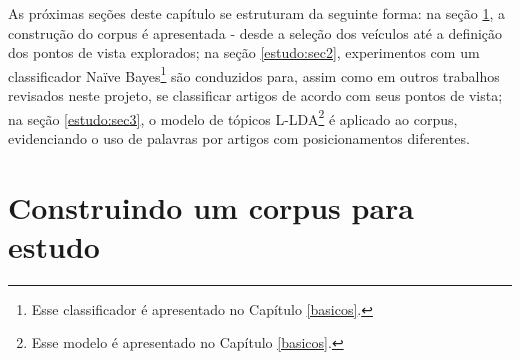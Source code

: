 
As próximas seções deste capítulo se estruturam da seguinte forma: na seção \ref{estudo:sec1}, a construção do corpus é apresentada - desde a seleção dos veículos até a definição dos pontos de vista explorados; na seção \ref{estudo:sec2}, experimentos com um classificador Naïve Bayes\footnote{Esse classificador é apresentado no Capítulo \ref{basicos}.} são conduzidos para, assim como em outros trabalhos revisados neste projeto, se classificar artigos de acordo com seus pontos de vista; na seção \ref{estudo:sec3}, o modelo de tópicos L-LDA\footnote{Esse modelo é apresentado no Capítulo \ref{basicos}.} é aplicado ao corpus, evidenciando o uso de palavras por artigos com posicionamentos diferentes. 


\section{Construindo um corpus para estudo}
\label{estudo:sec1}


